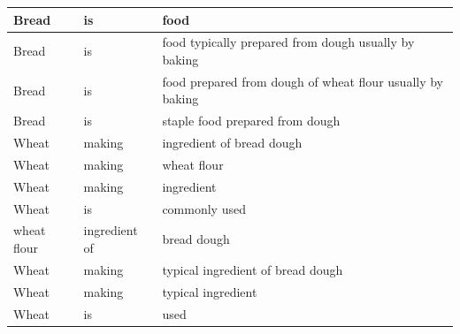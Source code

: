 \documentclass[12pt]{article}
\theoremstyle{grammarstyle}
\begin{document}
\begin{longtable}{|l|l|p{8cm}|}
    \hline
    Bread    &	is	&    food \\
    \hline
    Bread    &	is	&    food typically prepared from dough usually by baking \\
    \hline
    Bread    &	is	&    food prepared from dough of wheat flour usually by baking \\
    \hline
    Bread    &	is	&    staple food prepared from dough \\
    \hline
    Wheat    &	making	&    ingredient of bread dough \\
    \hline
    Wheat    &	making	&    wheat flour \\
    \hline
    Wheat    &	making	&    ingredient \\
    \hline
    Wheat    &	is	&    commonly used \\
    \hline
    wheat flour    &	ingredient of	&    bread dough \\
    \hline
    Wheat    &	making	&    typical ingredient of bread dough \\
    \hline
    Wheat    &	making	&    typical ingredient \\
    \hline
    Wheat    &	is	&    used \\
    \hline
\end{longtable}
\end{document}
